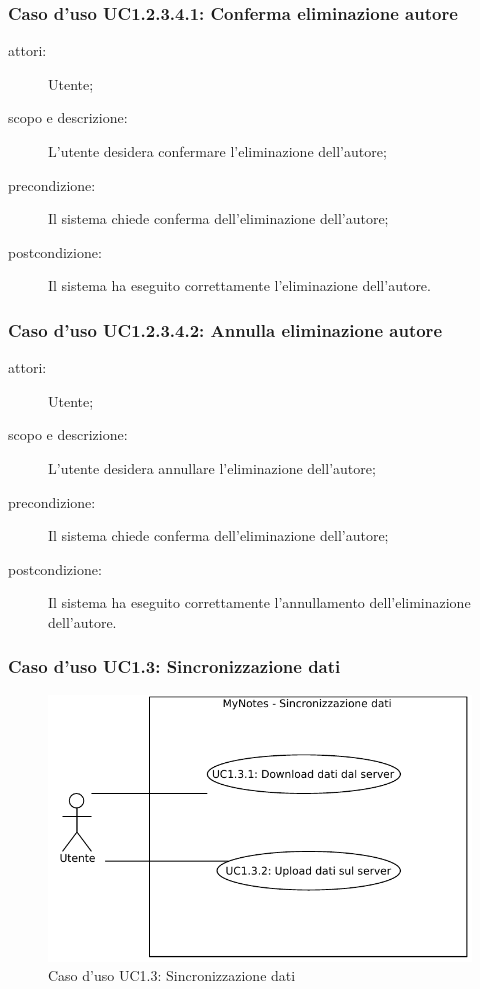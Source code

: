 \subsubsection{Caso d'uso UC1.2.3.4.1: Conferma eliminazione autore}
\begin{description}
\item[attori:] Utente;
\item[scopo e descrizione:] L'utente desidera confermare l'eliminazione dell'autore;
\item[precondizione:] Il sistema chiede conferma dell'eliminazione dell'autore;
\item[postcondizione:] Il sistema ha eseguito correttamente l'eliminazione dell'autore.
\end{description}

\subsubsection{Caso d'uso UC1.2.3.4.2: Annulla eliminazione autore}
\begin{description}
\item[attori:] Utente;
\item[scopo e descrizione:] L'utente desidera annullare l'eliminazione dell'autore;
\item[precondizione:] Il sistema chiede conferma dell'eliminazione dell'autore;
\item[postcondizione:] Il sistema ha eseguito correttamente l'annullamento dell'eliminazione dell'autore.
\end{description}

\subsubsection{Caso d'uso UC1.3: Sincronizzazione dati}
\begin{figure}[htb]
\centering
\includegraphics[scale=0.6]{gfx/useCase/MN_UC1-3_Sincronizzazione_dati.pdf}
\caption{Caso d'uso UC1.3: Sincronizzazione dati}
\label{fig:My notes UC1.3}
\end{figure}

